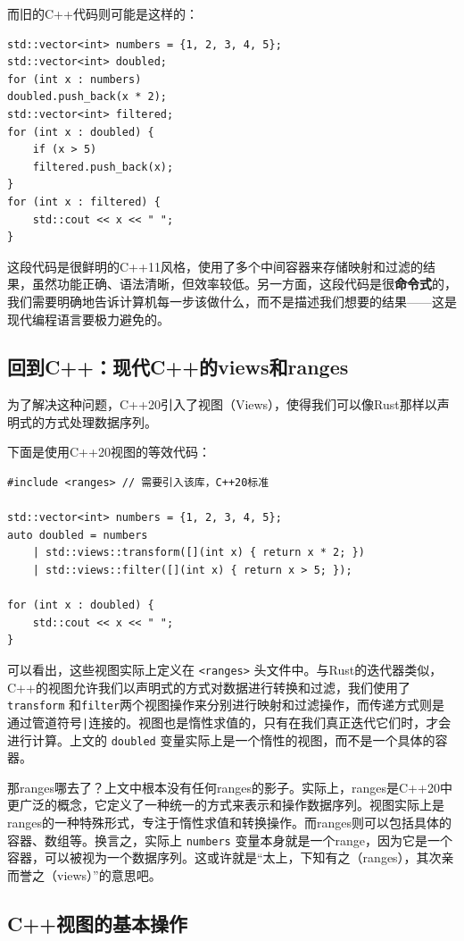 而旧的C++代码则可能是这样的：
\begin{verbatim}
std::vector<int> numbers = {1, 2, 3, 4, 5};
std::vector<int> doubled;
for (int x : numbers)
doubled.push_back(x * 2);
std::vector<int> filtered;
for (int x : doubled) {
    if (x > 5)
    filtered.push_back(x);
}
for (int x : filtered) {
    std::cout << x << " ";
}
\end{verbatim}
这段代码是很鲜明的C++11风格，使用了多个中间容器来存储映射和过滤的结果，虽然功能正确、语法清晰，但效率较低。另一方面，这段代码是很\textbf{命令式}的，我们需要明确地告诉计算机每一步该做什么，而不是描述我们想要的结果——这是现代编程语言要极力避免的。

\subsection{回到C++：现代C++的views和ranges}

为了解决这种问题，C++20引入了视图（Views），使得我们可以像Rust那样以声明式的方式处理数据序列。

下面是使用C++20视图的等效代码：
\begin{verbatim}
#include <ranges> // 需要引入该库，C++20标准

std::vector<int> numbers = {1, 2, 3, 4, 5};
auto doubled = numbers
    | std::views::transform([](int x) { return x * 2; })
    | std::views::filter([](int x) { return x > 5; });

for (int x : doubled) {
    std::cout << x << " ";
}
\end{verbatim}

可以看出，这些视图实际上定义在 \verb|<ranges>| 头文件中。与Rust的迭代器类似，C++的视图允许我们以声明式的方式对数据进行转换和过滤，我们使用了 \verb|transform| 和\verb|filter|两个视图操作来分别进行映射和过滤操作，而传递方式则是通过管道符号\verb+|+连接的。视图也是惰性求值的，只有在我们真正迭代它们时，才会进行计算。上文的 \verb|doubled| 变量实际上是一个惰性的视图，而不是一个具体的容器。

那ranges哪去了？上文中根本没有任何ranges的影子。实际上，ranges是C++20中更广泛的概念，它定义了一种统一的方式来表示和操作数据序列。视图实际上是ranges的一种特殊形式，专注于惰性求值和转换操作。而ranges则可以包括具体的容器、数组等。换言之，实际上 \verb|numbers| 变量本身就是一个range，因为它是一个容器，可以被视为一个数据序列。这或许就是“太上，下知有之（ranges），其次亲而誉之（views）”的意思吧。

\subsection{C++视图的基本操作}

